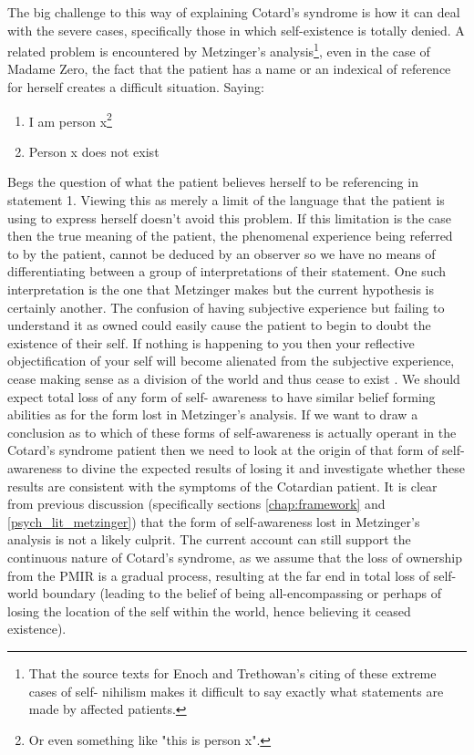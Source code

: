 The big challenge to this way of explaining Cotard's syndrome is how it can deal with the severe cases, specifically those in which self-existence is totally denied. A related problem is encountered by Metzinger's analysis\footnote{That the source texts for Enoch and Trethowan's citing of these extreme cases of self- nihilism makes it difficult to say exactly what statements are made by affected patients.}, even in the case of Madame Zero, the fact that the patient has a name or an indexical of reference for herself creates a difficult situation. Saying:
\begin{enumerate}
    \item I am person x\footnote{Or even something like "this is person x".}
    \item Person x does not exist
\end{enumerate}
Begs the question of what the patient believes herself to be referencing in statement 1. Viewing this as merely a limit of the language that the patient is using to express herself doesn't avoid this problem. If this limitation is the case then the true meaning of the patient, the phenomenal experience being referred to by the patient, cannot be deduced by an observer so we have no means of differentiating between a group of interpretations of their statement. One such interpretation is the one that Metzinger makes but the current hypothesis is certainly another. The confusion of having subjective experience but failing to understand it as owned could easily cause the patient to begin to doubt the existence of their self. If nothing is happening to you then your reflective objectification of your self will become alienated from the subjective experience, cease making sense as a division of the world and thus cease to exist \cite[p. 313]{metzinger2003}. We should expect total loss of any form of self- awareness to have similar belief forming abilities as for the form lost in Metzinger's analysis. If we want to draw a conclusion as to which of these forms of self-awareness is actually operant in the Cotard's syndrome patient then we need to look at the origin of that form of self-awareness to divine the expected results of losing it and investigate whether these results are consistent with the symptoms of the Cotardian patient. It is clear from previous discussion (specifically sections \ref{chap:framework} and \ref{psych_lit_metzinger}) that the form of self-awareness lost in Metzinger's analysis is not a likely culprit. The current account can still support the continuous nature of Cotard's syndrome, as we assume that the loss of ownership from the PMIR is a gradual process, resulting at the far end in total loss of self-world boundary (leading to the belief of being all-encompassing or perhaps of losing the location of the self within the world, hence believing it ceased existence).


